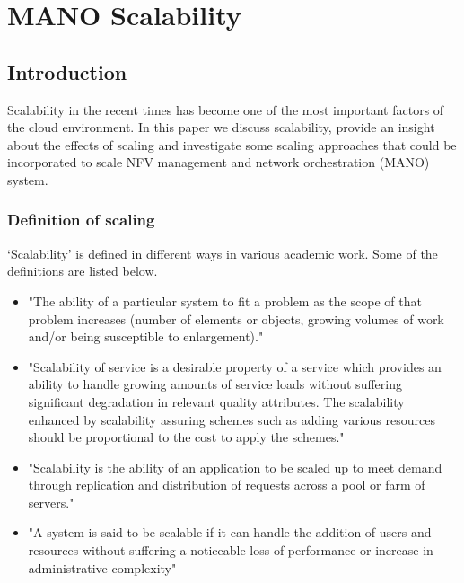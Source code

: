 \chapter{MANO Scalability}
\label{ch:Scalability}

\section{Introduction}


Scalability in the recent times has become one of the most important factors of the cloud environment. In this paper we discuss scalability, provide an insight about the effects of scaling and investigate some scaling approaches that could be incorporated to scale NFV management and network orchestration (MANO) system.

\subsection{Definition of scaling}
`Scalability' is defined in different ways in various academic work. Some of the definitions are listed below.
\begin{itemize}	 
	
	\item "The ability of a particular system to fit a problem as the scope of that problem increases (number of elements or objects, growing volumes of work and/or being susceptible to enlargement)." \cite{furht_handbook_2010}
	
	\item "Scalability of service is a desirable property of a service which provides an ability to handle growing amounts of service loads without suffering significant degradation in relevant quality attributes. The scalability enhanced by scalability assuring schemes such as adding various resources should be proportional to the cost to apply the schemes." \cite{lee_software_2010}
	
	\item "Scalability is the ability of an application to be scaled up to meet demand through replication and distribution of requests across a pool or farm of servers." \cite{chieu_scalability_2011}
	
	\item "A system is said to be scalable if it can handle the addition of users and resources without suffering a noticeable loss of performance or increase in administrative complexity" \cite{noauthor_scale_nodate}
	
\end{itemize}

